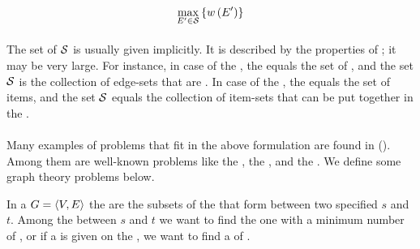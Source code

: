 \begin{equation}
\displaystyle\max_{E'\in\mathcal{S}}\left\{ w\left( E' \right) \right\}
\end{equation}

\paragraph{}
The set of  $\mathcal{S}$ is usually given implicitly. It is described by the properties of ; it may be very large. For instance, in case of the , the  equals the set of , and the set $\mathcal{S}$ is the collection of edge-sets that are . In case of the , the  equals the set of items, and the set $\mathcal{S}$ equals the collection of item-sets that can be put together in the .

\paragraph{}
Many examples of problems that fit in the above formulation are found in  (). Among them are well-known problems like the , the , and the . We define some graph theory problems below.

\begin{definition}
In a  $G=\left\langle V,E \right\rangle$ the  are the subsets of the  that form  between two specified  $s$ and $t$. Among the  between $s$ and $t$ we want to find the one with a minimum number of , or if a  is given on the , we want to find a  of .
\end{definition}

